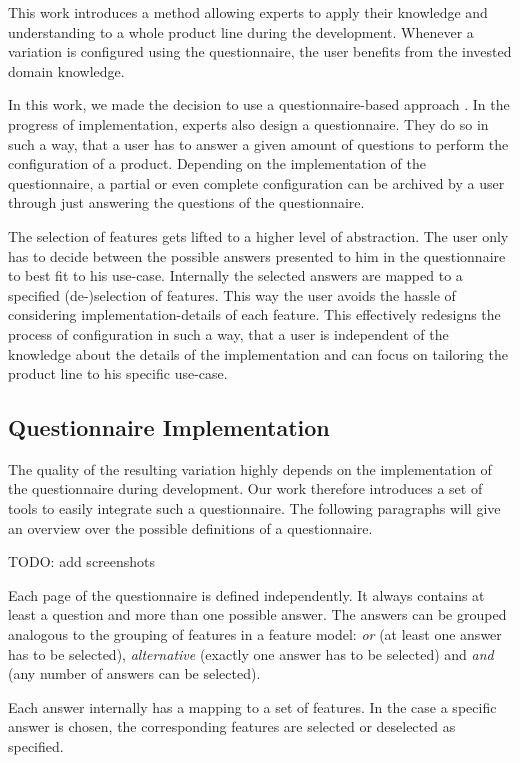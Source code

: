 This work introduces a method allowing experts to apply their knowledge and understanding to a whole product line during the development. Whenever a variation is configured using the questionnaire, the user benefits from the invested domain knowledge.

In this work, we made the decision to use a questionnaire-based approach \cite{qbvm}. In the progress of implementation, experts also design a questionnaire. They do so in such a way, that a user has to answer a given amount of questions to perform the configuration of a product. Depending on the implementation of the questionnaire, a partial or even complete configuration can be archived by a user through just answering the questions of the questionnaire.

The selection of features gets lifted to a higher level of abstraction. The user only has to decide between the possible answers presented to him in the questionnaire to best fit to his use-case. Internally the selected answers are mapped to a specified (de-)selection of features. This way the user avoids the hassle of considering implementation-details of each feature. This effectively redesigns the process of configuration in such a way, that a user is independent of the knowledge about the details of the implementation and can focus on tailoring the product line to his specific use-case.

\subsection{Questionnaire Implementation}

The quality of the resulting variation highly depends on the implementation of the questionnaire during development. Our work therefore introduces a set of tools to easily integrate such a questionnaire. The following paragraphs will give an overview over the possible definitions of a questionnaire.

{\color{red} TODO: add screenshots}

Each page of the questionnaire is defined independently. It always contains at least a question and more than one possible answer. The answers can be grouped analogous to the grouping of features in a feature model: \textit{or} (at least one answer has to be selected), \textit{alternative} (exactly one answer has to be selected) and \textit{and} (any number of answers can be selected).

Each answer internally has a mapping to a set of features. In the case a specific answer is chosen, the corresponding features are selected or deselected as specified.

